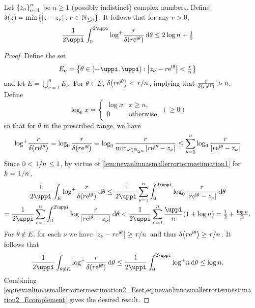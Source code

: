 \begin{lemma}\label{lem:nevanlinnasmallerrortermestimation2}
    Let \(\qty{z_\nu}_{\nu=1}^n\) be \(n\geq1\) (possibly indistinct) complex numbers. Define \(\textstyle\delta(z)=\min\cbraces{\abs{z-z_\nu}}{\nu\in\mathbb{N}_{\leq n}}\). It follows that for any \(r>0\), \[\frac1{2\uppi}\int_0^{2\uppi}\logp\frac{r}{\delta\qty(r\ee^{\ii\theta})}\dd{\theta}\leq2\log n+\tfrac12\]
\end{lemma}
\begin{proof}
    Define the set \[E_\nu=\cbraces{\theta\in(-\uppi,\uppi)}{\abs{z_\nu-r\ee^{\ii\theta}}<\tfrac{r}{n}}\]
    and let \(E=\textstyle\bigcup_{\nu=1}^n E_\nu\). For \(\theta\in E\), \(\delta\qty(r\ee^{\ii\theta})<\flatfrac{r}{n}\), implying that \(\tfrac{r}{\delta\qty(r\mathrm{e}^{\mathrm{i}\theta})}>n\). Define \[\log_0x=
        \begin{cases}
            \log x&x\geq n,\\
            0&\text{otherwise},
    \end{cases}(\geq 0)\]
    so that for \(\theta\) in the prescribed range, we have \[\mathop{\log^+\!}\frac{r}{\delta\qty(r\mathrm{e}^{\mathrm{i}\theta})}=\log_0\frac{r}{\delta\qty(r\mathrm{e}^{\mathrm{i}\theta})}=\log_0\frac{r}{\min_{\nu\in\mathbb{N}_{\leq n}}\abs{r\mathrm{e}^{\mathrm{i}\theta}-z_\nu}}\leq\sum_{\nu=1}^n\log_0\frac{r}{\abs{r\mathrm{e}^{\mathrm{i}\theta}-z_\nu}}\]
    Since \(0<\flatfrac1n\leq1\), by virtue of \cref{lem:nevanlinnasmallerrortermestimation1} for \(k=\flatfrac1n\),
    \begin{multline}
        \frac1{2\uppi}\int_E\logp\frac{r}{\delta\qty(r\ee^{\ii\theta})}\dd{\theta}\leq\frac1{2\uppi}\sum_{\nu=1}^n\int_0^{2\uppi}\log_0\frac{r}{\abs{r\ee^{\ii\theta}-z_\nu}}\dd{\theta}\\
        =\frac1{2\uppi}\sum_{\nu=1}^n\int_0^{2\uppi}\log\frac{r}{\abs{r\ee^{\ii\theta}-z_\nu}}\dd{\theta}<\frac1{2\uppi}\sum_{\nu=1}^n\frac{\uppi}{n}\qty(1+\log n)=\tfrac12+\tfrac{\log n}2.\label{eq:nevanlinnasmallerrortermestimation2_Eset}
    \end{multline}
    For \(\theta\notin E\), for each \(\nu\) we have \(\abs{z_\nu-r\ee^{\ii\theta}}\geq\flatfrac{r}{n}\) and thus \(\delta\qty(r\ee^{\ii\theta})\geq\flatfrac{r}{n}\). It follows that
    \begin{equation}
        \frac1{2\uppi}\int_{\theta\notin E}\logp\frac{r}{\delta\qty(r\ee^{\ii\theta})}\dd{\theta}\leq\frac1{2\uppi}\int_0^{2\uppi}\logp n\dd{\theta}\leq\log n.\label{eq:nevanlinnasmallerrortermestimation2_Ecomplement}
    \end{equation}
    Combining \cref{eq:nevanlinnasmallerrortermestimation2_Eset,eq:nevanlinnasmallerrortermestimation2_Ecomplement} gives the desired result.
\end{proof}
